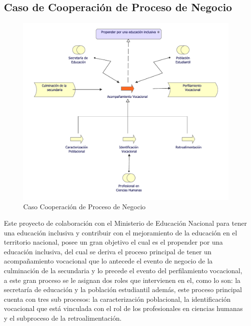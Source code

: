 \subsection{Caso de Cooperación de Proceso de Negocio}
\begin{figure}[h!]
	\centering
	\includegraphics[width=.9\linewidth]{imgs/caso/negocio/CoopProNegocio}
	\caption{Caso Cooperación de Proceso de Negocio}
\end{figure}

Este proyecto de colaboración con el Ministerio de Educación Nacional para tener una educación inclusiva y contribuir con el mejoramiento de la educación en el territorio nacional, posee un gran objetivo el cual es el propender por una educación inclusiva, del cual se deriva el proceso principal de tener un acompañamiento vocacional que lo antecede el evento de negocio de la culminación de la secundaria y lo precede el evento del perfilamiento vocacional, a este gran proceso se le asignan dos roles que intervienen en el, como lo son: la secretaría de educación y la población estudiantil además, este proceso principal cuenta con tres sub procesos: la caracterización poblacional, la identificación vocacional que está vinculada con el rol de los profesionales en ciencias humanas y el subproceso de la retroalimentación.
